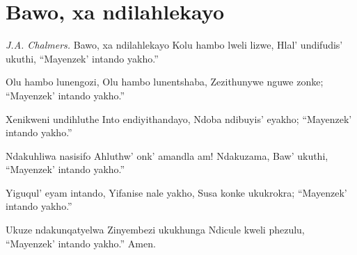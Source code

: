 \starttocol
\chapter{Bawo, xa ndilahlekayo}
\nexttocol
\hfill{\it J.A. Chalmers.}
\stoptocol
\starttocol
\startlines
{\sc Bawo}, xa ndilahlekayo
Kolu hambo lweli lizwe,
Hlal' undifudis' ukuthi,
``Mayenzek' intando yakho.''

Olu hambo lunengozi,
Olu hambo lunentshaba,
Zezithunywe nguwe zonke;
``Mayenzek' intando yakho.''

Xenikweni undihluthe
Into endiyithandayo,
Ndoba ndibuyis' eyakho;
``Mayenzek' intando yakho.''

Ndakuhliwa nasisifo
Ahluthw' onk' amandla am!
Ndakuzama, Baw' ukuthi,
``Mayenzek' intando yakho.''

Yiguqul' eyam intando,
Yifanise nale yakho,
Susa konke ukukrokra;
``Mayenzek' intando yakho.''

Ukuze ndakunqatyelwa
Zinyembezi ukukhunga
Ndicule kweli phezulu,
``Mayenzek' intando yakho.''
    \hfill          Amen.~~~~~~~~~


\stoplines
\nexttocol

\stoptocol
